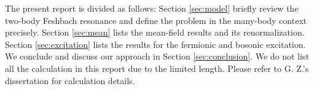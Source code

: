 \documentclass[reprint,pra]{revtex4-1}
\begin{document}

The present report is divided as follows:
Section \ref{sec:model}  briefly review the two-body Feshbach resonance and define the problem in the many-body context precisely. Section \ref{sec:mean} lists the mean-field results and its renormalization. Section \ref{sec:excitation} lists the results for the fermionic and bosonic excitation. We conclude and discuss our approach in Section \ref{sec:conclusion}.  
We do not list all the calculation in this report due to the limited length. Please refer to G. Z.'s dissertation \cite{Zhuthesis} for calculation details. 
\end{document}
